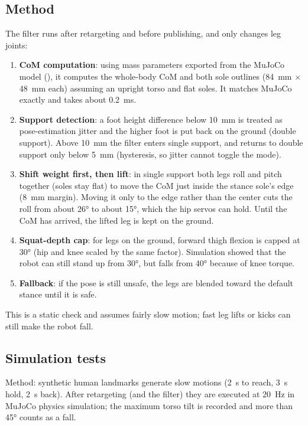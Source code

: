\documentclass[11pt,a4paper]{article}
\begin{document}
\subsection{Method}
The filter runs after retargeting and before publishing, and only changes leg joints:
\begin{enumerate}
  \item \textbf{CoM computation}: using mass parameters exported from the MuJoCo model (), it computes the whole-body CoM and both sole outlines (84~mm $\times$ 48~mm each) assuming an upright torso and flat soles. It matches MuJoCo exactly and takes about 0.2~ms.
  \item \textbf{Support detection}: a foot height difference below 10~mm is treated as pose-estimation jitter and the higher foot is put back on the ground (double support). Above 10~mm the filter enters single support, and returns to double support only below 5~mm (hysteresis, so jitter cannot toggle the mode).
  \item \textbf{Shift weight first, then lift}: in single support both legs roll and pitch together (soles stay flat) to move the CoM just inside the stance sole's edge (8~mm margin). Moving it only to the edge rather than the center cuts the roll from about 26° to about 15°, which the hip servos can hold. Until the CoM has arrived, the lifted leg is kept on the ground.
  \item \textbf{Squat-depth cap}: for legs on the ground, forward thigh flexion is capped at 30° (hip and knee scaled by the same factor). Simulation showed that the robot can still stand up from 30°, but falls from 40° because of knee torque.
  \item \textbf{Fallback}: if the pose is still unsafe, the legs are blended toward the default stance until it is safe.
\end{enumerate}
This is a static check and assumes fairly slow motion; fast leg lifts or kicks can still make the robot fall.

\subsection{Simulation tests}
Method: synthetic human landmarks generate slow motions (2~s to reach, 3~s hold, 2~s back). After retargeting (and the filter) they are executed at 20~Hz in MuJoCo physics simulation; the maximum torso tilt is recorded and more than 45° counts as a fall.
\end{document}
